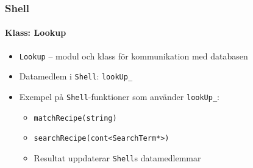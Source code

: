 \begin{frame}
  \frametitle{Shell}
  \framesubtitle{Klass: Lookup}
  \begin{itemize}
  \item \texttt{Lookup} -- modul och klass för kommunikation med databasen
  \item<2-> Datamedlem i \texttt{Shell}: \texttt{lookUp\_}
  \item<3-> Exempel på \texttt{Shell}-funktioner som använder \texttt{lookUp\_}:
    \begin{itemize}
    \item \texttt{matchRecipe(string)}
    \item \texttt{searchRecipe(cont<SearchTerm*>)}
    \item Resultat uppdaterar \texttt{Shell}s datamedlemmar
    \end{itemize}
  \end{itemize}
\end{frame}

